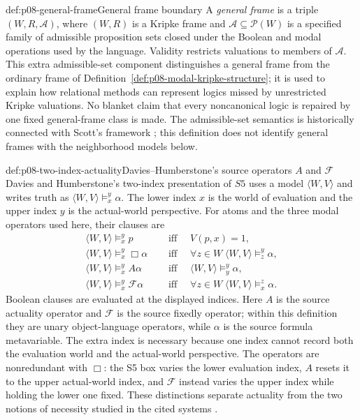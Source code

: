 \begin{hbdefinition}{def:p08-general-frame}{General frame boundary}
A \emph{general frame} is a triple \((W,R,\mathcal A)\), where
\((W,R)\) is a Kripke frame and \(\mathcal A\subseteq\mathcal P(W)\) is a
specified family of admissible proposition sets closed under the Boolean and
modal operations used by the language.  Validity restricts valuations to
members of \(\mathcal A\).  This extra admissible-set component distinguishes a
general frame from the ordinary frame of
Definition~\ref{def:p08-modal-kripke-structure}; it is used to explain how
relational methods can represent logics missed by unrestricted Kripke
valuations.  No blanket claim that every noncanonical logic is repaired by one
fixed general-frame class is made.
The admissible-set semantics is historically connected with Scott's framework
\cite{Scott1970}; this definition does not identify general frames with the
neighborhood models below.
\end{hbdefinition}

\begin{hbdefinition}{def:p08-two-index-actuality}{Davies--Humberstone's source operators \(A\) and \(\mathcal F\)}
Davies and Humberstone's two-index presentation of \(S5\) uses a
model \(\langle W,V\rangle\) and writes truth as
\(\langle W,V\rangle\models_x^y\alpha\).  The lower index \(x\) is the
world of evaluation and the upper index \(y\) is the actual-world
perspective.  For atoms and the three modal operators used here, their clauses
are
\[
\begin{aligned}
 \langle W,V\rangle\models_x^y p
 &\quad\text{ iff }\quad V(p,x)=1,\\
 \langle W,V\rangle\models_x^y\Box\alpha
 &\quad\text{ iff }\quad
   \forall z\in W\;\langle W,V\rangle\models_z^y\alpha,\\
 \langle W,V\rangle\models_x^y A\alpha
 &\quad\text{ iff }\quad
   \langle W,V\rangle\models_y^y\alpha,\\
 \langle W,V\rangle\models_x^y\mathcal F\alpha
 &\quad\text{ iff }\quad
   \forall z\in W\;\langle W,V\rangle\models_x^z\alpha.
\end{aligned}
\]
Boolean clauses are evaluated at the displayed indices.  Here \(A\) is the
source actuality operator and \(\mathcal F\) is the source fixedly operator;
within this definition they are unary object-language operators, while
\(\alpha\) is the source formula metavariable.  The extra index is necessary
because one index cannot record both the evaluation world and the actual-world
perspective.  The operators are nonredundant with \(\Box\): the S5 box varies
the lower evaluation index, \(A\) resets it to the upper actual-world index,
and \(\mathcal F\) instead varies the upper index while holding the lower one
fixed.  These distinctions separate actuality from the two notions of
necessity studied in the cited systems
\cite{CrossleyHumberstone1977,DaviesHumberstone1980}.
\end{hbdefinition}

